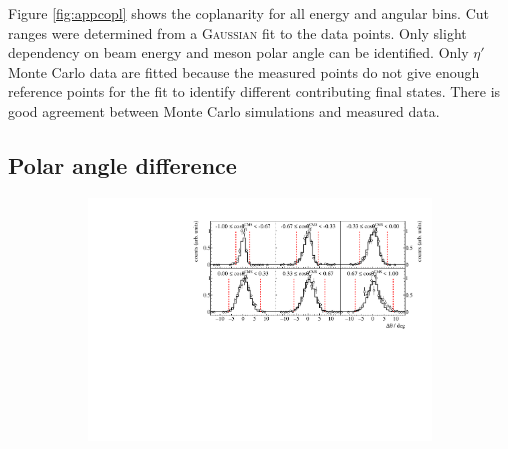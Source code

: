 Figure \ref{fig:appcopl} shows the coplanarity for all energy and angular bins. Cut ranges were determined from a \textsc{Gaussian} fit to the data points. Only slight dependency on beam energy and meson polar angle can be identified. Only $\eta'$ Monte Carlo data are fitted because the measured points do not give enough reference points for the fit to identify different contributing final states. There is good agreement between Monte Carlo simulations and measured data.
\newpage
\subsection{Polar angle difference}
\begin{figure}[H]
	\centering
	\begin{subfigure}{\linewidth}
		\includegraphics[width=\linewidth]{../figs/hydrogen/bin_cuts/thetacut_ebin1.pdf}
	\end{subfigure}
	

\end{figure}
